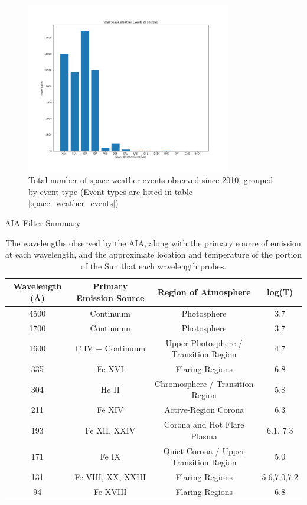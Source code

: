 \documentclass[12pt, letterpaper]{article}
\begin{document}
\begin{figure}
    \includegraphics[width=0.8\textwidth]{figures/Space_Weather_Plot.png}
    \centering
    \caption{Total number of space weather events observed since 2010, grouped by event type (Event types are listed in table \ref{space_weather_events})}
    \label{swe_freq}
\end{figure}

\begin{table}
\centering
\caption*{AIA Filter Summary}
\begin{tabular}{||c| c | c | c ||} 
 \hline
 Wavelength (\AA) & Primary Emission Source & Region of Atmosphere & log(T)\\ [0.5ex] 
 \hline\hline
  4500 & Continuum & Photosphere & 3.7 \\
 \hline
 1700 & Continuum & Photosphere & 3.7 \\
 \hline
 1600 & C IV + Continuum & Upper Photosphere / Transition Region & 4.7 \\
 \hline
 335 & Fe XVI & Flaring Regions & 6.8 \\
 \hline
 304 & He II & Chromosphere / Transition Region & 5.8 \\
 \hline
 211 & Fe XIV & Active-Region Corona & 6.3 \\
 \hline
 193 & Fe XII, XXIV & Corona and Hot Flare Plasma & 6.1, 7.3 \\
 \hline 
 171 & Fe IX & Quiet Corona / Upper Transition Region & 5.0 \\
 \hline
 131 & Fe VIII, XX, XXIII & Flaring Regions & 5.6,7.0,7.2 \\
 \hline
 94 & Fe XVIII & Flaring Regions & 6.8 \\
 \hline
 
\end{tabular}
\vspace{0.5em}
\caption{The wavelengths observed by the AIA, along with the primary source of emission at each wavelength, and the approximate location and temperature of the portion of the Sun that each wavelength probes. \cite{AIA_ConceptReport}}
\label{AIA_wavelengths}
\end{table}
\end{document}
